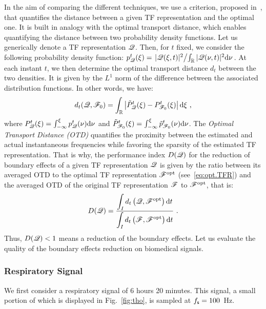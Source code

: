 In the aim of comparing the different techniques, we use a criterion, proposed in~\cite{Daubechies16conceft}, that quantifies the distance between a given TF representation and the optimal one. It is built in analogy with the optimal transport distance, which enables quantifying the distance between two probability density functions. Let us generically denote a TF representation ${\mathscr Q}$. Then, for $t$ fixed, we consider the following probability density function: $p_{\mathscr Q}^t(\xi) = \left. |{\mathscr Q}(\xi,t)|^2 \middle/ \int_{\mathbb R} |{\mathscr Q}(\nu,t)|^2\mathrm{d}\nu \right.$. At each instant $t$, we then determine the optimal transport distance $d_{t}$ between the two densities. It is given by the $L^1$ norm of the difference between the associated distribution functions. In other words, we have:
\begin{equation*}
d_{t}(\ccQ,\ccF_0) = \int_\RR\left|\tilde P_{\ccQ}^t(\xi)-  P_{\ccF_0}^t(\xi)\right|\dd\xi\ ,
\end{equation*}
where $P_{{\mathscr Q}}^t(\xi)=\int_{-\infty}^\xi p_{{\mathscr Q}}^t(\nu)\mathrm{d}\nu$ and $\tilde P_{{\mathscr F}_0}^t(\xi)=\int_{-\infty}^\xi\tilde p_{{\mathscr F}_0}^t(\nu)\mathrm{d}\nu$. The \textit{Optimal Transport Distance (OTD)} quantifies the proximity between the estimated and actual instantaneous frequencies while favoring the sparsity of the estimated TF representation. That is why, the performance index $D({\mathscr Q})$ for the reduction of boundary effects of a given TF representation ${\mathscr Q}$ is given by the ratio between its averaged OTD to the optimal TF representation ${\mathscr F}^\mathrm{opt}$ (see~\eqref{eq:opt.TFR}) and the averaged OTD of the original TF representation ${\mathscr F}$ to ${\mathscr F}^\mathrm{opt}$, that is:
\begin{equation}
D(\ccQ) = \dfrac{\displaystyle\int_I d_{t}\left(\ccQ,\ccF^\mathrm{opt}\right)\dd t}{\displaystyle\int_I d_{t}\left(\ccF,\ccF^\mathrm{opt}\right)\dd t}\ .
\label{eq:index.perf}
\end{equation}
Thus, $D({\mathscr Q})<1$ means a reduction of the boundary effects. Let us evaluate the quality of the boundary effects reduction on biomedical signals.


\subsubsection{Respiratory Signal}
We first consider a respiratory signal of 6 hours 20 minutes. This signal, a small portion of which is displayed in Fig.~\ref{fig:tho}, is sampled at $f_{\mathsf s}=100$~Hz.

